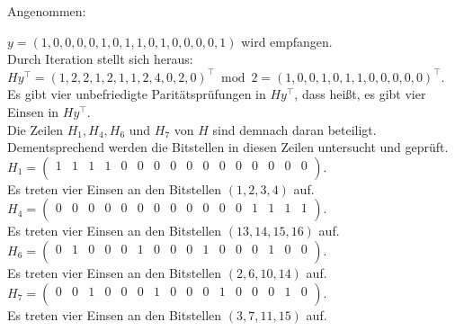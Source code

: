     
    \begin{Beispiel}
        Angenommen:
    
        $y = (1,0,0,0,0,1,0,1,1,0,1,0,0,0,0,1)$ wird empfangen.\\
        
        Durch Iteration stellt sich heraus:\\
        $Hy^\intercal= (1,2,2,1,2,1,1,2,4,0,2,0)^\intercal \bmod 2= (1,0,0,1,0,1,1,0,0,0,0,0)^\intercal.$\\
        
        Es gibt vier unbefriedigte Paritätsprüfungen in $Hy^\intercal$,
        dass hei\ss{}t, es gibt vier Einsen in $Hy^\intercal.$\\
        Die Zeilen $H_1, H_4, H_6$ und $H_7$ von $H$ sind demnach daran beteiligt. 
        Dementsprechend werden die Bitstellen in diesen Zeilen untersucht und geprüft.\\
        
        
        $H_1= \left( \begin{array}{rrrrrrrrrrrrrrrr}
            1 & 1 & 1 & 1 & 0 & 0 & 0 & 0 & 0 & 0 & 0 & 0 & 0 & 0 & 0 & 0 \\
           \end{array}\right). 
        $\\
        Es treten vier Einsen an den Bitstellen $(1, 2, 3, 4)$ auf.\\
        
        $H_4= \left( \begin{array}{rrrrrrrrrrrrrrrr}
            0 & 0 & 0 & 0 & 0 & 0 & 0 & 0 & 0 & 0 & 0 & 0 & 1 & 1 & 1 & 1 \\
           \end{array}\right). 
        $\\
        Es treten vier Einsen an den Bitstellen $(13, 14, 15, 16)$ auf.\\
        
        $H_6= \left( \begin{array}{rrrrrrrrrrrrrrrr}
            0 & 1 & 0 & 0 & 0 & 1 & 0 & 0 & 0 & 1 & 0 & 0 & 0 & 1 & 0 & 0 \\
           \end{array}\right). 
        $\\
        Es treten vier Einsen an den Bitstellen $(2, 6, 10, 14)$ auf.\\
        
        $H_7= \left( \begin{array}{rrrrrrrrrrrrrrrr}
            0 & 0 & 1 & 0 & 0 & 0 & 1 & 0 & 0 & 0 & 1 & 0 & 0 & 0 & 1 & 0 \\
           \end{array}\right). 
        $\\
        Es treten vier Einsen an den Bitstellen $(3, 7, 11, 15)$ auf.\\
        

\end{Beispiel}

